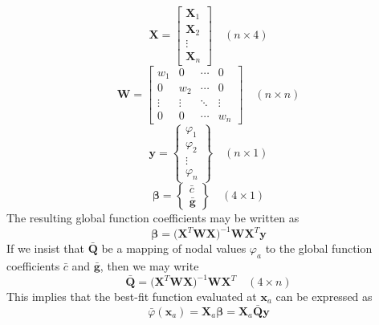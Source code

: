 \documentclass[11pt]{article} %
\begin{document}
\begin{equation}
	\mathbf{X} = \left[ \begin{array}{c} \mathbf{X}_1 \\ \mathbf{X}_2 \\ \vdots \\ \mathbf{X}_n \end{array} \right] \quad (n\times4)
\end{equation}
\begin{equation}
	\mathbf{W} = \left[ \begin{array}{cccc} w_1 & 0 & \cdots & 0 \\ 0 & w_2 & \cdots & 0 \\ \vdots & \vdots & \ddots & \vdots \\ 0 & 0 & \cdots & w_n \end{array} \right] \quad (n\times n)
\end{equation}
\begin{equation}
	\mathbf{y} = \left\{ \begin{array}{c} \varphi_1 \\ \varphi_2 \\ \vdots \\ \varphi_n \end{array} \right\} \quad (n \times 1)
\end{equation}
\begin{equation}
	\mathbf{\beta} = \left\{ \begin{array}{c} \bar{c} \\ \bar{\mathbf{g}} \end{array} \right\} \quad (4 \times 1)
\end{equation}
The resulting global function coefficients may be written as
\begin{equation}
	\mathbf{\beta} = \big( \mathbf{X}^T \mathbf{W} \mathbf{X} \big)^{-1} \mathbf{W} \mathbf{X}^T \mathbf{y}
\end{equation}
If we insist that $\bar{\mathbf{Q}}$ be a mapping of nodal values $\varphi_a$ to the global function coefficients $\bar{c}$ and $\bar{\mathbf{g}}$, then we may write
\begin{equation}
	\bar{\mathbf{Q}} = \big( \mathbf{X}^T \mathbf{W} \mathbf{X} \big)^{-1} \mathbf{W} \mathbf{X}^T \quad (4 \times n)
\end{equation}
This implies that the best-fit function evaluated at $\mathbf{x}_a$ can be expressed as
\begin{equation}
	\bar{\varphi} (\mathbf{x}_a) = \mathbf{X}_a \mathbf{\beta} = \mathbf{X}_a \bar{\mathbf{Q}} \mathbf{y}
\end{equation}
\end{document}
